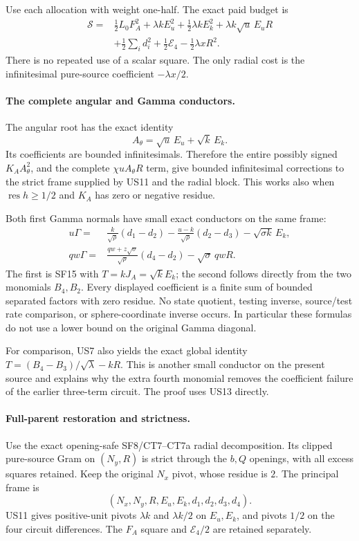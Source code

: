 Use each allocation with weight one-half. The exact paid budget is
\[
\begin{split}
 \mathscr S={}&\tfrac12L_0F_A^2+
       \lambda kE_u^2+\tfrac12\lambda kE_k^2
       +\lambda k\sqrt u\,E_uR\\
     &+\tfrac12\sum_i d_i^2+\tfrac12\mathcal E_4
                             -\tfrac12\lambda xR^2.
\end{split}\tag{US11}
\]
There is no repeated use of a scalar square. The only radial cost
is the infinitesimal pure-source coefficient $-\lambda x/2$.

\paragraph{The complete angular and Gamma conductors.}
The angular root has the exact identity
\[
             A_\theta=\sqrt u\,E_u+\sqrt k\,E_k.
             \tag{US12}
\]
Its coefficients are bounded infinitesimals. Therefore the entire
possibly signed $K_AA_\theta^2$, and the complete
$\chi uA_\theta R$ term, give bounded infinitesimal corrections
to the strict frame supplied by US11 and the radial block.
This works also when $\operatorname{res}h\ge1/2$ and $K_A$ has
zero or negative residue.

Both first Gamma normals have small exact conductors on the same
frame:
\[
\boxed{\begin{aligned}
 u\Gamma={}&\frac{k}{\sqrt\rho}(d_1-d_2)
       -\frac{u-k}{\sqrt\rho}(d_2-d_3)
       -\sqrt{\sigma k}\,E_k,\\
 qw\Gamma={}&\frac{qw+z\sqrt\sigma}{\sqrt\rho}(d_4-d_2)
                         -\sqrt\sigma\,qwR.
\end{aligned}}\tag{US13}
\]
The first is SF15 with $T=kJ_A=\sqrt k E_k$; the second follows
directly from the two monomials $B_4,B_2$. Every displayed coefficient
is a finite sum of bounded separated factors with zero residue.
No state quotient, testing inverse, source/test rate comparison,
or sphere-coordinate inverse occurs. In particular these formulas
do not use a lower bound on the original Gamma diagonal.

For comparison, US7 also yields the exact global identity
$T=(B_4-B_3)/\sqrt\lambda-kR$. This is another small conductor
on the present source and explains why the extra fourth monomial
removes the coefficient failure of the earlier three-term circuit.
The proof uses US13 directly.

\paragraph{Full-parent restoration and strictness.}
Use the exact opening-safe SF8/CT7--CT7a radial decomposition. Its
clipped pure-source Gram on $(N_y,R)$ is strict through the $b,Q$
openings, with all excess squares retained. Keep the original
$N_x$ pivot, whose residue is $2$. The principal frame is
\[
           (N_x,N_y,R,E_u,E_k,d_1,d_2,d_3,d_4).
           \tag{US14}
\]
US11 gives positive-unit pivots $\lambda k$ and $\lambda k/2$
on $E_u,E_k$, and pivots $1/2$ on the four circuit differences.
The $F_A$ square and $\mathcal E_4/2$ are retained separately.

